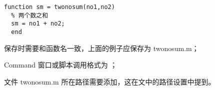 \vspace{-0.8cm}
\begin{lstlisting}[caption = 第一个函数]
  function sm = twonosum(no1,no2)
  % 两个数之和
  sm = no1 + no2;
  end
\end{lstlisting}

\begindot
  \item 保存时需要和函数名一致，上面的例子应保存为 twonosum.m；
  \item Command 窗口或脚本调用格式为 ；
  \item 文件 twonosum.m 所在路径需要添加，这在文中的路径设置中提到。
\myenddot

